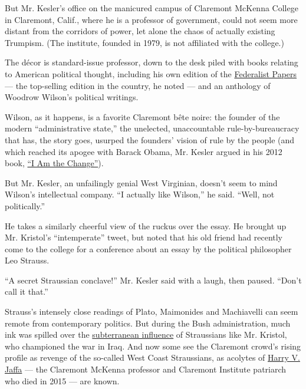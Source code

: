 But Mr. Kesler's office on the manicured campus of Claremont McKenna
College in Claremont, Calif., where he is a professor of government,
could not seem more distant from the corridors of power, let alone the
chaos of actually existing Trumpism. (The institute, founded in 1979, is
not affiliated with the college.)

The décor is standard-issue professor, down to the desk piled with books
relating to American political thought, including his own edition of the
\href{http://www.h-net.org/reviews/showrev.php?id=4621}{Federalist
Papers} --- the top-selling edition in the country, he noted --- and an
anthology of Woodrow Wilson's political writings.

Wilson, as it happens, is a favorite Claremont bête noire: the founder
of the modern ``administrative state,'' the unelected, unaccountable
rule-by-bureaucracy that has, the story goes, usurped the founders'
vision of rule by the people (and which reached its apogee with Barack
Obama, Mr. Kesler argued in his 2012 book,
\href{http://www.nytimes3xbfgragh.onion/2012/09/30/books/review/the-great-disconnect.html}{``I
Am the Change''}).

But Mr. Kesler, an unfailingly genial West Virginian, doesn't seem to
mind Wilson's intellectual company. ``I actually like Wilson,'' he said.
``Well, not politically.''

He takes a similarly cheerful view of the ruckus over the essay. He
brought up Mr. Kristol's ``intemperate'' tweet, but noted that his old
friend had recently come to the college for a conference about an essay
by the political philosopher Leo Strauss.

``A secret Straussian conclave!'' Mr. Kesler said with a laugh, then
paused. ``Don't call it that.''

Strauss's intensely close readings of Plato, Maimonides and Machiavelli
can seem remote from contemporary politics. But during the Bush
administration, much ink was spilled over the
\href{http://www.nytimes3xbfgragh.onion/2003/05/04/weekinreview/the-nation-leo-cons-a-classicist-s-legacy-new-empire-builders.html}{subterranean
influence} of Straussians like Mr. Kristol, who championed the war in
Iraq. And now some see the Claremont crowd's rising profile as revenge
of the so-called West Coast Straussians, as acolytes of
\href{https://www.nytimes3xbfgragh.onion/2015/01/12/us/politics/harry-v-jaffa-conservative-scholar-and-goldwater-muse-dies-at-96.html?_r=0}{Harry
V. Jaffa} --- the Claremont McKenna professor and Claremont Institute
patriarch who died in 2015 --- are known.

